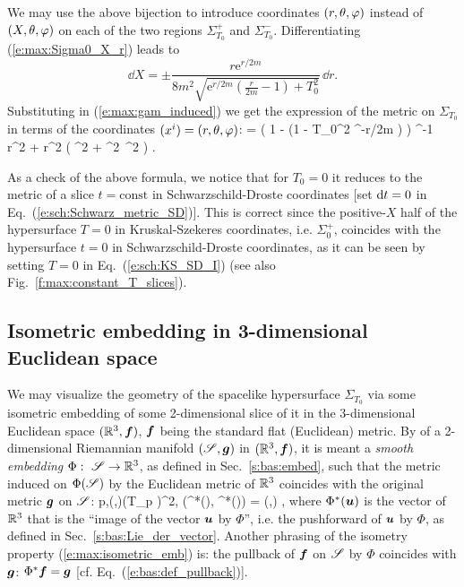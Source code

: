We may use the above bijection to introduce coordinates $(r,\theta,\varphi)$ instead of $(X,\theta,\varphi)$
on each of the two regions $\Sigma^+_{T_0}$ and $\Sigma^-_{T_0}$.
Differentiating (\ref{e:max:Sigma0_X_r}) leads to
\[
    \dd X = \pm \frac{r \mathrm{e}^{r/2m}}{8m^2 \sqrt{\mathrm{e}^{r/2m} \left( \frac{r}{2m} - 1 \right) + T_0^2}} \, \dd r .
\]
Substituting in (\ref{e:max:gam_induced}) we get the expression of the
metric on $\Sigma_{T_0}$ in terms of the coordinates $(x^i) = (r,\theta,\varphi)$:
\be \label{e:max:Sigma0_metric}
    \w{\gamma} = \left(
    1 -  \left(1 -  T_0^2 ^{-r/2m} \right) \right) ^{-1} \, \dd r^2
     +  r^2 \left( \dd\th^2 + \sin^2\th\, \dd\ph^2 \right) .
\ee
\begin{remark} \label{r:max:check_metric_SigmaT0}
As a check of the above formula, we notice that for $T_0=0$ it reduces to the
metric of a slice $t=\mathrm{const}$ in Schwarzschild-Droste coordinates
[set $\mathrm{d} t =0$ in Eq.~(\ref{e:sch:Schwarz_metric_SD})]. This is correct since
the positive-$X$ half of the hypersurface $T=0$ in Kruskal-Szekeres coordinates,
i.e. $\Sigma_0^+$,
coincides with the hypersurface $t=0$ in Schwarzschild-Droste coordinates,
as it can be seen by setting $T=0$ in Eq.~(\ref{e:sch:KS_SD_I})
(see also Fig.~\ref{f:max:constant_T_slices}).
\end{remark}

\subsection{Isometric embedding in 3-dimensional Euclidean space}
\label{s:max:isometric_emb}

We may visualize the geometry of the spacelike hypersurface $\Sigma_{T_0}$
via some isometric embedding of some 2-dimensional slice of it
in the 3-dimensional Euclidean space $(\mathbb{R}^3, \bm{f})$, $\bm{f}$ being the standard
flat (Euclidean) metric.
By 
of a 2-dimensional Riemannian manifold $(\mathscr{S},\bm{g})$
in $(\mathbb{R}^3,\bm{f})$, it is meant a \emph{smooth embedding} $\Phi:\ \mathscr{S} \rightarrow \mathbb{R}^3$,
as defined in Sec.~\ref{s:bas:embed},
such that the metric induced on $\Phi(\mathscr{S})$ by the Euclidean metric of $\mathbb{R}^3$
coincides with the original metric $\bm{g}$ on $\mathscr{S}$:
\be \label{e:max:isometric_emb}
    \forall p\in \Sp,\quad  \forall (,)\in (T_p \Sp)^2,\quad
        (\Phi^*(), \Phi^*()) = (,) ,
\ee
where $\Phi^*(\bm{u})$ is the vector of $\mathbb{R}^3$ that is the
``image of the vector $\bm{u}$ by $\Phi$'', i.e.
the pushforward of $\bm{u}$ by $\Phi$, as defined in
Sec.~\ref{s:bas:Lie_der_vector}. Another phrasing of the
isometry property (\ref{e:max:isometric_emb}) is: the pullback of $\bm{f}$
on $\mathscr{S}$ by $\Phi$ coincides with $\bm{g}$: $\Phi^*\bm{f} = \bm{g}$ [cf. Eq.~(\ref{e:bas:def_pullback})].

